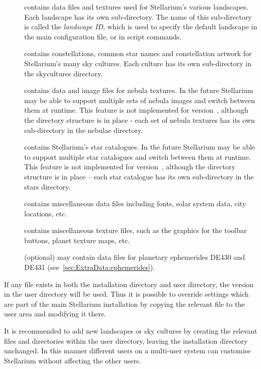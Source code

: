 \begin{description}
\item[] contains data files and textures used for
  Stellarium's various landscapes. Each landscape has its own
  sub-directory. The name of this sub-directory is called the
  \emph{landscape ID}, which is used to specify the default landscape in
  the main configuration file, or in script commands.
\item[] contains constellations, common star names and
  constellation artwork for Stellarium's many sky cultures. Each culture
  has its own sub-directory in the skycultures directory.
\item[] contains data and image files for nebula textures.
  In the future Stellarium may be able to support multiple sets of nebula
  images and switch between them at runtime. This feature is not
  implemented for version~\StelVersion, although the directory structure is in
  place - each set of nebula textures has its own sub-directory in the
  nebulae directory.
\item[] contains Stellarium's star catalogues. In the
  future Stellarium may be able to support multiple star catalogues
  and switch between them at runtime. This feature is not implemented
  for version~\StelVersion, although the directory structure is in
  place -- each star catalogue has its own sub-directory in the stars
  directory.
\item[] contains miscellaneous data files including fonts,
  solar system data, city locations, etc.
\item[] contains miscellaneous texture files, such as the
  graphics for the toolbar buttons, planet texture maps, etc.
\item[] (optional) may contain data files for planetary
  ephemerides DE430 and DE431 (see~\ref{sec:ExtraData:ephemerides}).
\end{description}

If any file exists in both the installation directory and user
directory, the version in the user directory will be used. Thus it is
possible to override settings which are part of the main Stellarium
installation by copying the relevant file to the user area and modifying
it there.

It is recommended to add new landscapes or sky cultures by creating the relevant files
and directories within the user directory, leaving the installation
directory unchanged. In this manner different users on a multi-user
system can customise Stellarium without affecting the other users. 

